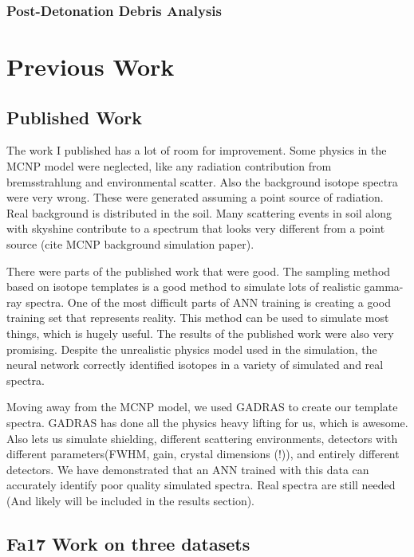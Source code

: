 \documentclass[10pt,letterpaper]{article}
\begin{document}
\subsubsection{Post-Detonation Debris Analysis}


\section{Previous Work}

\subsection{Published Work}

The work I published has a lot of room for improvement. Some physics in the MCNP model were neglected, like any radiation contribution from bremsstrahlung and environmental scatter. Also the background isotope spectra were very wrong. These were generated assuming a point source of radiation. Real background is distributed in the soil. Many scattering events in soil along with skyshine contribute to a spectrum that looks very different from a point source (cite MCNP background simulation paper). 

There were parts of the published work that were good. The sampling method based on isotope templates is a good method to simulate lots of realistic gamma-ray spectra. One of the most difficult parts of ANN training is creating a good training set that represents reality. This method can be used to simulate most things, which is hugely useful. The results of the published work were also very promising. Despite the unrealistic physics model used in the simulation, the neural network correctly identified isotopes in a variety of simulated and real spectra. 

Moving away from the MCNP model, we used GADRAS to create our template spectra. GADRAS has done all the physics heavy lifting for us, which is awesome. Also lets us simulate shielding, different scattering environments, detectors with different parameters(FWHM, gain, crystal dimensions (!)), and entirely different detectors. We have demonstrated that an ANN trained with this data can accurately identify poor quality simulated spectra. Real spectra are still needed (And likely will be included in the results section).

\subsection{Fa17 Work on three datasets}
\end{document}
